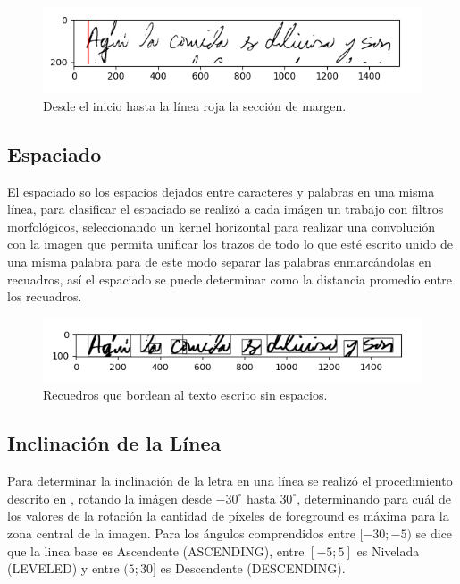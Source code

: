 \documentclass[10pt, a4paper]{article}
\begin{document}
            \begin{figure}[!h]
                \centering
                \includegraphics[width = 0.5\linewidth]{Margin.png}
                \caption{Desde el inicio hasta la l\'inea roja la secci\'on de margen.}
            \end{figure}
        \subsection{Espaciado} 

            El espaciado so los espacios dejados entre caracteres y palabras en una misma l\'inea, para clasificar el espaciado se realiz\'o a cada im\'agen un trabajo con filtros morfol\'ogicos, seleccionando un kernel horizontal para realizar una convoluci\'on con la imagen 
            que permita unificar los trazos de todo lo que est\'e escrito unido de una misma palabra para de este modo separar las palabras enmarc\'andolas en recuadros, as\'i el espaciado se puede determinar como la distancia promedio entre los recuadros.

            \begin{figure}[!h]
                \centering
                \includegraphics[width = 0.5\linewidth]{Espaces.png}
                \caption{Recuedros que bordean al texto escrito sin espacios.}
            \end{figure}

        \subsection{Inclinaci\'on de la L\'inea}
            Para determinar la inclinaci\'on de la letra en una l\'inea se realiz\'o el procedimiento descrito en \cite{20}, rotando la im\'agen desde $-30^{\circ}$ hasta $30^{\circ}$, 
            determinando para cu\'al de los valores de la rotaci\'on la cantidad de p\'ixeles de foreground es m\'axima para la zona central de la imagen. Para los \'angulos comprendidos 
            entre $ [-30; -5) $ se dice que la linea base es Ascendente (ASCENDING), entre $[-5; 5]$ es Nivelada (LEVELED) y entre $(5; 30]$ es Descendente (DESCENDING). 
\end{document}
